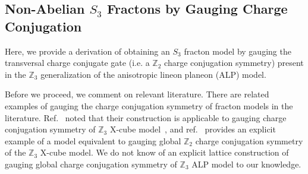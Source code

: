 \documentclass[aps,prx,reprint,superscriptaddress,nofootinbib]{revtex4-2}
\theoremstyle{definition}
\newcommand{\<}{\langle}
\renewcommand{\>}{\rangle}
\begin{document}
\begin{appendix}





\section{Non-Abelian $S_3$ Fractons by Gauging Charge Conjugation}\label{app:s3-ALP}

Here, we provide a derivation of obtaining an $S_3$ fracton model by gauging the transversal charge conjugate gate (i.e. a $\mathbb{Z}_2$ charge conjugation symmetry) present in the $\mathbb{Z}_3$ generalization of the anisotropic lineon planeon (ALP) model.

Before we proceed, we comment on relevant literature. There are related examples of gauging the charge conjugation symmetry of fracton models in the literature. Ref.~\cite{Bulmash_2019} noted that their construction is applicable to gauging charge conjugation symmetry of $\mathbb{Z}_3$ X-cube model~\cite{Vijay_2016}, and ref.~\cite{Tu_2021} provides an explicit example of a model equivalent to gauging global $\mathbb{Z}_2$ charge conjugation symmetry of the $\mathbb{Z}_3$ X-cube model. We do not know of an explicit lattice construction of gauging global charge conjugation symmetry of $\mathbb{Z}_3$ ALP model to our knowledge.


\end{appendix}
\end{document}
